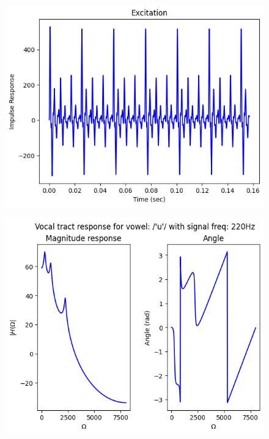 \documentclass{article}
\begin{document}
\begin{figure}[H]
\begin{center}
\includegraphics[scale = 0.5]{Q4_C1R.png}
\end{center}
\end{figure}


\begin{figure}[H]
\begin{center}
\includegraphics[scale = 0.5]{Q4_C2.png}
\end{center}
\end{figure}
\end{document}
